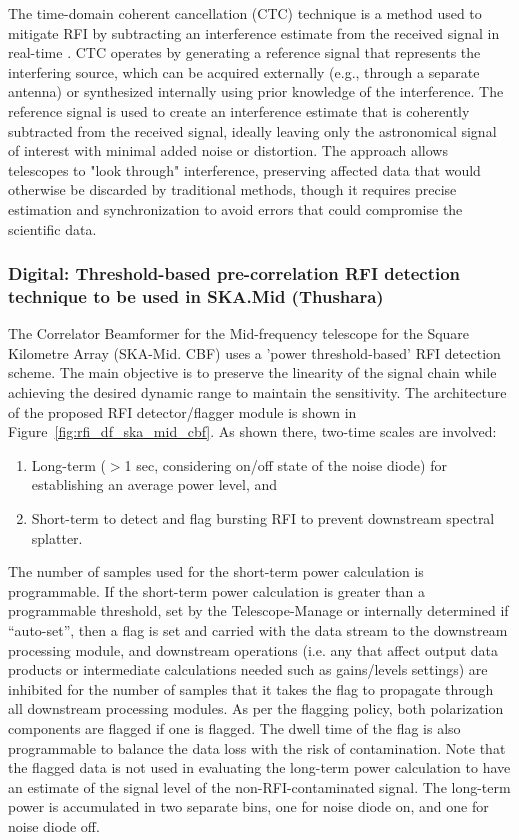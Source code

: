 The time-domain coherent cancellation (CTC) technique is a method used to mitigate RFI by subtracting an interference estimate from the received signal in real-time \cite{ellingson2022coherent}. CTC operates by generating a reference signal that represents the interfering source, which can be acquired externally (e.g., through a separate antenna) or synthesized internally using prior knowledge of the interference. The reference signal is used to create an interference estimate that is coherently subtracted from the received signal, ideally leaving only the astronomical signal of interest with minimal added noise or distortion. The approach allows telescopes to "look through" interference, preserving affected data that would otherwise be discarded by traditional methods, though it requires precise estimation and synchronization to avoid errors that could compromise the scientific data.

\subsubsection{Digital: Threshold-based pre-correlation RFI detection technique to be used in SKA.Mid (Thushara)}
\label{subsection:hardware:catalog:ska-mid}

The Correlator Beamformer for the Mid-frequency telescope for the Square Kilometre Array (SKA-Mid. CBF) uses a 'power threshold-based' RFI detection scheme. The main objective is to preserve the linearity of the signal chain while achieving the desired dynamic range to maintain the sensitivity. The architecture of the proposed RFI detector/flagger module is shown in Figure~\ref{fig:rfi_df_ska_mid_cbf}. As shown there, two-time scales are involved:
\begin{enumerate}
    \item Long-term ($>$1 sec, considering on/off state of the noise diode) for establishing an average power level, and
    \item Short-term to detect and flag bursting RFI to prevent downstream spectral splatter.
\end{enumerate}

The number of samples used for the short-term power calculation is programmable. If the short-term power calculation is greater than a programmable threshold, set by the Telescope-Manage or internally determined if “auto-set”, then a flag is set and carried with the data stream to the downstream processing module, and downstream operations (i.e. any that affect output data products or intermediate calculations needed such as gains/levels settings) are inhibited for the number of samples that it takes the flag to propagate through all downstream processing modules. As per the flagging policy, both polarization components are flagged if one is flagged. The dwell time of the flag is also programmable to balance the data loss with the risk of contamination. Note that the flagged data is not used in evaluating the long-term power calculation to have an estimate of the signal level of the non-RFI-contaminated signal. The long-term power is accumulated in two separate bins, one for noise diode on, and one for noise diode off.

